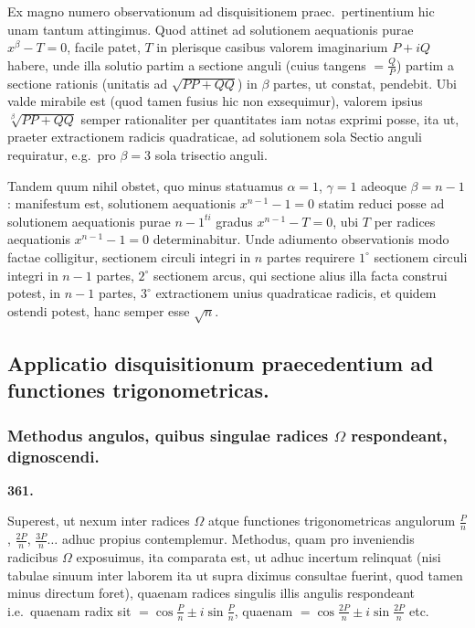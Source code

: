 \documentclass[12pt,a4paper]{article}
\theoremstyle{plain}
\theoremstyle{definition}
\theoremstyle{remark}
\begin{document}
Ex magno numero observationum ad disquisitionem praec.\ pertinentium hic unam tantum attingimus. Quod attinet ad solutionem aequationis purae $x^\beta - T = 0$, facile patet, $T$ in plerisque casibus valorem imaginarium $P + iQ$ habere, unde illa solutio partim a sectione anguli (cuius tangens $= \tfrac{Q}{P}$) partim a sectione rationis (unitatis ad $\sqrt{PP + QQ}$) in $\beta$ partes, ut constat, pendebit. Ubi valde mirabile est (quod tamen fusius hic non exsequimur), valorem ipsius $\sqrt[\beta]{PP + QQ}$ semper rationaliter per quantitates iam notas exprimi posse, ita ut, praeter extractionem radicis quadraticae, ad solutionem sola Sectio anguli requiratur, e.g.\ pro $\beta = 3$ sola trisectio anguli.

Tandem quum nihil obstet, quo minus statuamus $\alpha = 1$, $\gamma = 1$ adeoque $\beta = n - 1$: manifestum est, solutionem aequationis $x^{n-1} - 1 = 0$ statim reduci posse ad solutionem aequationis purae $n-1^{ti}$ gradus $x^{n-1} - T = 0$, ubi $T$ per radices aequationis $x^{n-1} - 1 = 0$ determinabitur. Unde adiumento observationis modo factae colligitur, sectionem circuli integri in $n$ partes requirere $1^{\circ}$ sectionem circuli integri in $n-1$ partes, $2^{\circ}$ sectionem arcus, qui sectione alius illa facta construi potest, in $n-1$ partes, $3^{\circ}$ extractionem unius quadraticae radicis, et quidem ostendi potest, hanc semper esse $\sqrt{n}$.


\subsection*{Applicatio disquisitionum praecedentium ad functiones trigonometricas.}

\subsubsection*{Methodus angulos, quibus singulae radices $\Omega$ respondeant, dignoscendi.}

\begin{center}
\textbf{361.}
\end{center}

Superest, ut nexum inter radices $\Omega$ atque functiones trigonometricas angulorum $\tfrac{P}{n}$, $\tfrac{2P}{n}$, $\tfrac{3P}{n} \ldots$ adhuc propius contemplemur. Methodus, quam pro inveniendis radicibus $\Omega$ exposuimus, ita comparata est, ut adhuc incertum relinquat (nisi tabulae sinuum inter laborem ita ut supra diximus consultae fuerint, quod tamen minus directum foret), quaenam radices singulis illis angulis respondeant i.e.\ quaenam radix sit $= \cos\tfrac{P}{n} \pm i\sin\tfrac{P}{n}$, quaenam $= \cos\tfrac{2P}{n} \pm i\sin\tfrac{2P}{n}$ etc.
\end{document}
